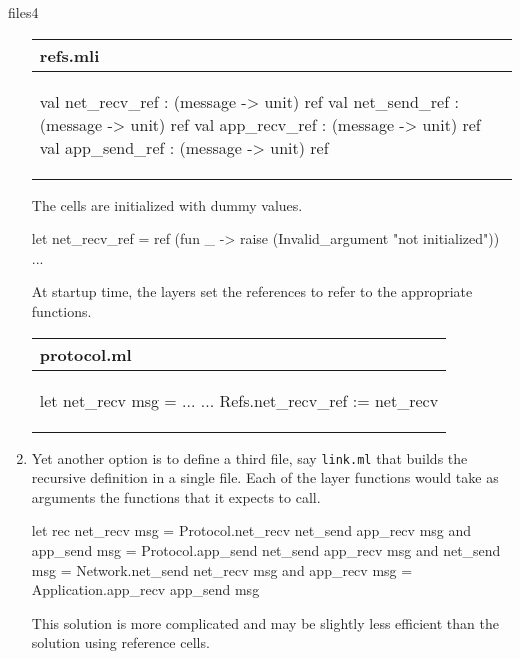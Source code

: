 \begin{exercise}{files4}
\begin{answer}
\begin{enumerate}
\begin{center}
\begin{tabular}{l}
refs.mli\\
\hline
\begin{minipage}{5in}
\begin{ocaml}
val net_recv_ref : (message -> unit) ref
val net_send_ref : (message -> unit) ref
val app_recv_ref : (message -> unit) ref
val app_send_ref : (message -> unit) ref
\end{ocaml}
\end{minipage}
\end{tabular}
\end{center}
%
The cells are initialized with dummy values.
\begin{ocaml}
let net_recv_ref = ref (fun _ -> raise (Invalid_argument "not initialized"))
...
\end{ocaml}
%
At startup time, the layers set the references to refer to the
appropriate functions.

\begin{center}
\begin{tabular}{l}
protocol.ml\\
\hline
\begin{minipage}{3in}
\begin{ocaml}
let net_recv msg = ...
...
Refs.net_recv_ref := net_recv
\end{ocaml}
\end{minipage}
\end{tabular}
\end{center}

\item

Yet another option is to define a third file,
say \hbox{\lstinline+link.ml+} that builds the recursive definition in
a single file.  Each of the layer functions would take as arguments
the functions that it expects to call.

\begin{ocaml}
let rec net_recv msg =
   Protocol.net_recv net_send app_recv msg
and app_send msg =
   Protocol.app_send net_send app_recv msg
and net_send msg =
   Network.net_send net_recv msg
and app_recv msg =
   Application.app_recv app_send msg
\end{ocaml}
%
This solution is more complicated and may be slightly less efficient
than the solution using reference cells.

\end{enumerate}
\fi\end{answer}
\end{exercise}

